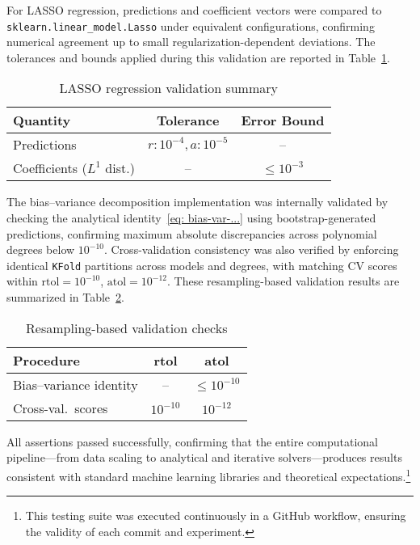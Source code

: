 \documentclass[
 reprint,            %
 amsmath,amssymb,
 aps,
]{revtex4-2}
\begin{document}
For LASSO regression, predictions and coefficient vectors were compared to \texttt{sklearn.linear\_model.Lasso} under equivalent configurations, confirming numerical agreement up to small regularization-dependent deviations. 
The tolerances and bounds applied during this validation are reported in Table~\ref{tab:lasso_validation}.

\begin{table}[H]
\centering
\small
\setlength{\tabcolsep}{3pt}
\caption{LASSO regression validation summary}
\label{tab:lasso_validation}
\begin{tabular}{lcc}
\toprule
\textbf{Quantity} & \textbf{Tolerance} & \textbf{Error Bound} \\
\midrule
Predictions & $r:10^{-4}, a:10^{-5}$ & – \\
Coefficients ($L^1$ dist.) & – & $\le 10^{-3}$ \\
\bottomrule
\end{tabular}
\end{table}

The bias–variance decomposition implementation was internally validated by checking the analytical identity~\ref{eq: bias-var-...} using bootstrap-generated predictions, 
confirming maximum absolute discrepancies across polynomial degrees below $10^{-10}$. 
Cross-validation consistency was also verified by enforcing identical \texttt{KFold} partitions across models and degrees, 
with matching CV scores within \(\text{rtol}=10^{-10}\), \(\text{atol}=10^{-12}\). 
These resampling-based validation results are summarized in Table~\ref{tab:resampling_validation}.

\begin{table}[H]
\centering
\small
\setlength{\tabcolsep}{3pt}
\caption{Resampling-based validation checks}
\label{tab:resampling_validation}
\begin{tabular}{lcc}
\toprule
\textbf{Procedure} & \textbf{rtol} & \textbf{atol} \\
\midrule
Bias–variance identity & – & $\le 10^{-10}$ \\
Cross-val.\ scores & $10^{-10}$ & $10^{-12}$ \\
\bottomrule
\end{tabular}
\end{table}

All assertions passed successfully, confirming that the entire computational pipeline—from data scaling to analytical and iterative solvers—produces results consistent with standard machine learning libraries and theoretical expectations.\footnote{This testing suite was executed continuously in a GitHub workflow, ensuring the validity of each commit and experiment.}
\end{document}
